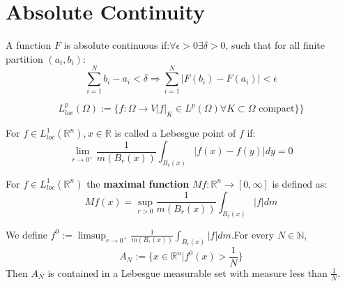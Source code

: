 \newpage
\section{Absolute Continuity}
\begin{definition}
A function $F$ is absolute continuous if:$\forall \epsilon > 0 \exists \delta > 0$, such that for all finite partition $(a_i, b_i)$: 
\begin{equation*}
	\sum_{i = 1}^N b_i - a_i < \delta \Rightarrow \sum_{i = 1}^N |F(b_i) - F(a_i)| < \epsilon
\end{equation*}

\end{definition}
\begin{remark}
\end{remark}

\begin{definition}
	\begin{equation*}
		L^p_{loc}(\Omega) := \{ f: \Omega \rightarrow V | f|_K \in L^p(\Omega) \forall K \subset \Omega \text{ compact} \}   \}
	\end{equation*}
\end{definition}

\begin{definition}
	For $f \in L_{loc}^1(\mathbb{R}^n), x \in \mathbb{R}$ is called a Lebesgue point of $f$ if:
	\begin{equation*}
		\lim_{r \rightarrow 0^+} \frac{1}{m(B_r(x))} \int_{B_r(x)} |f(x) - f(y)|dy = 0
	\end{equation*}
\end{definition}

\begin{definition}
	For $ f \in L^1_{loc}(\mathbb{R}^n)$ the \textbf{maximal function} $Mf: \mathbb{R}^n \rightarrow [0, \infty]$ is defined as:
	\begin{equation*}
		Mf(x) = \sup_{r > 0} \frac{1}{m(B_r(x))} \int_{B_r(x)} |f|dm
	\end{equation*}
\end{definition}

\begin{lemma}
	We define $f^0 := \limsup_{r \rightarrow 0^+} \frac{1}{m(B_r(x))} \int_{B_r(x)} |f|dm$.For every $N \in \mathbb{N}$, 
	\begin{equation*}
		A_N := \{ x \in \mathbb{R}^n | f^0(x) > \frac{1}{N} \}
	\end{equation*}
	Then $A_N$ is contained in a Lebesgue measurable set with measure less than $\frac{1}{N}$.
\end{lemma}

